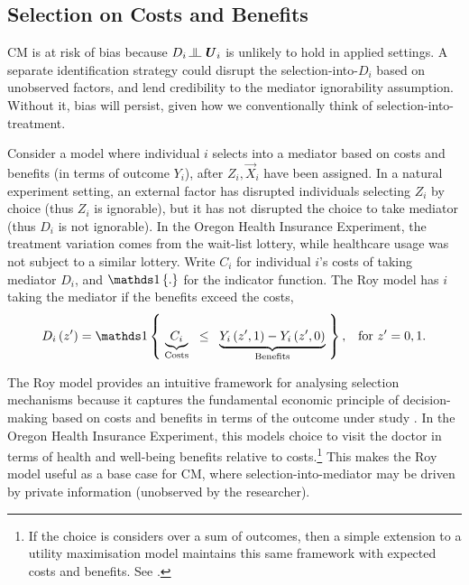 \subsection{Selection on Costs and Benefits}
CM is at risk of bias because $D_i \indep  \vec U_i$ %
is unlikely to hold in applied settings.
A separate identification strategy could disrupt the selection-into-$D_i$ based on unobserved factors, and lend credibility to the mediator ignorability assumption.
Without it, bias will persist, given how we conventionally think of selection-into-treatment.

Consider a model where individual $i$ selects into a mediator based on costs and benefits (in terms of outcome $Y_i$), after $Z_i, \vec X_i$ have been assigned.
In a natural experiment setting, an external factor has disrupted individuals selecting $Z_i$ by choice (thus $Z_i$ is ignorable), but it has not disrupted the choice to take mediator (thus $D_i$ is not ignorable).
In the Oregon Health Insurance Experiment, the treatment variation comes from the wait-list lottery, while healthcare usage was not subject to a similar lottery.
Write $C_i$ for individual $i$'s costs of taking mediator $D_i$, and $\indicator{.}$ for the indicator function.
The Roy model has $i$ taking the mediator if the benefits exceed the costs,
\begin{equation}
    \label{eqn:roy-model}
    D_i \left( z' \right) = \indicator{ \;
    \underbrace{C_i}_{\text{Costs}} \;\; \leq \;\;
        \underbrace{
            Y_i\left( z', 1 \right) - Y_i\left( z', 0 \right)}_{\text{Benefits}}
    \;}, \;\;\; \text{for } z'=0,1.
\end{equation}

The Roy model provides an intuitive framework for analysing selection mechanisms because it captures the fundamental economic principle of decision-making based on costs and benefits in terms of the outcome under study \citep{roy1951some,heckman1990empirical}.
In the Oregon Health Insurance Experiment, this models choice to visit the doctor in terms of health and well-being benefits relative to costs.\footnote{
    If the choice is considers over a sum of outcomes, then a simple extension to a utility maximisation model maintains this same framework with expected costs and benefits.
    See \cite{heckman1990empirical,eisenhauer2015generalized}.
}
This makes the Roy model useful as a base case for CM, where selection-into-mediator may be driven by private information (unobserved by the researcher).

